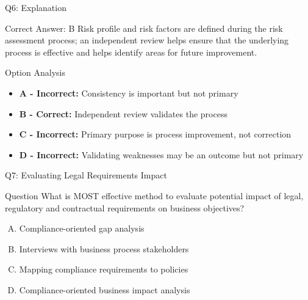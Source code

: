 \documentclass{beamer}
\begin{document}
	\begin{frame}{Q6: Explanation}
		\begin{block}{Correct Answer: B}
			Risk profile and risk factors are defined during the risk assessment process; an independent review helps ensure that the underlying process is effective and helps identify areas for future improvement.
		\end{block}
		\begin{block}{Option Analysis}
			\begin{itemize}
				\item \textbf{A - Incorrect:} Consistency is important but not primary
				\item \textbf{B - Correct:} Independent review validates the process
				\item \textbf{C - Incorrect:} Primary purpose is process improvement, not correction
				\item \textbf{D - Incorrect:} Validating weaknesses may be an outcome but not primary
			\end{itemize}
		\end{block}
	\end{frame}
	
	\begin{frame}{Q7: Evaluating Legal Requirements Impact}
		\begin{block}{Question}
			What is MOST effective method to evaluate potential impact of legal, regulatory and contractual requirements on business objectives?
		\end{block}
		\begin{enumerate}[(A)]
			\item Compliance-oriented gap analysis
			\item Interviews with business process stakeholders
			\item Mapping compliance requirements to policies
			\item Compliance-oriented business impact analysis
		\end{enumerate}
	\end{frame}
	
\end{document}
